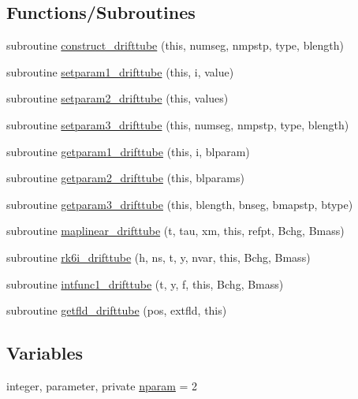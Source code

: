 \subsection*{Functions/\+Subroutines}
\begin{DoxyCompactItemize}
\item 
subroutine \mbox{\hyperlink{namespacedrifttubeclass_a322f55e58fbe6fb5e4ed93cd126e5ede}{construct\+\_\+drifttube}} (this, numseg, nmpstp, type, blength)
\item 
subroutine \mbox{\hyperlink{namespacedrifttubeclass_ae2e1974821a810c5d65afd4546b1a690}{setparam1\+\_\+drifttube}} (this, i, value)
\item 
subroutine \mbox{\hyperlink{namespacedrifttubeclass_a3883fd9688d0b98e279f57547de67b8c}{setparam2\+\_\+drifttube}} (this, values)
\item 
subroutine \mbox{\hyperlink{namespacedrifttubeclass_a5c05a55ca0f98570b2b02f3c84181015}{setparam3\+\_\+drifttube}} (this, numseg, nmpstp, type, blength)
\item 
subroutine \mbox{\hyperlink{namespacedrifttubeclass_ade5fb645fa735d4743cd431024727261}{getparam1\+\_\+drifttube}} (this, i, blparam)
\item 
subroutine \mbox{\hyperlink{namespacedrifttubeclass_af16030dcb46192b3748c28ceb1ca7d4f}{getparam2\+\_\+drifttube}} (this, blparams)
\item 
subroutine \mbox{\hyperlink{namespacedrifttubeclass_a4dc53dfc73175d3eb0d420c6cb9d64f8}{getparam3\+\_\+drifttube}} (this, blength, bnseg, bmapstp, btype)
\item 
subroutine \mbox{\hyperlink{namespacedrifttubeclass_aaf41c0aaec4dc3e16fc0f678b3220de3}{maplinear\+\_\+drifttube}} (t, tau, xm, this, refpt, Bchg, Bmass)
\item 
subroutine \mbox{\hyperlink{namespacedrifttubeclass_a186a18efb61fce23e16a18534af446fb}{rk6i\+\_\+drifttube}} (h, ns, t, y, nvar, this, Bchg, Bmass)
\item 
subroutine \mbox{\hyperlink{namespacedrifttubeclass_a053027aad7a9b20bafb34d676de9a14a}{intfunc1\+\_\+drifttube}} (t, y, f, this, Bchg, Bmass)
\item 
subroutine \mbox{\hyperlink{namespacedrifttubeclass_aa903101ae6943402917a2f29a8aa67d3}{getfld\+\_\+drifttube}} (pos, extfld, this)
\end{DoxyCompactItemize}
\subsection*{Variables}
\begin{DoxyCompactItemize}
\item 
integer, parameter, private \mbox{\hyperlink{namespacedrifttubeclass_af382d7cef81496c1d2c2bf3ba72c4350}{nparam}} = 2
\end{DoxyCompactItemize}


